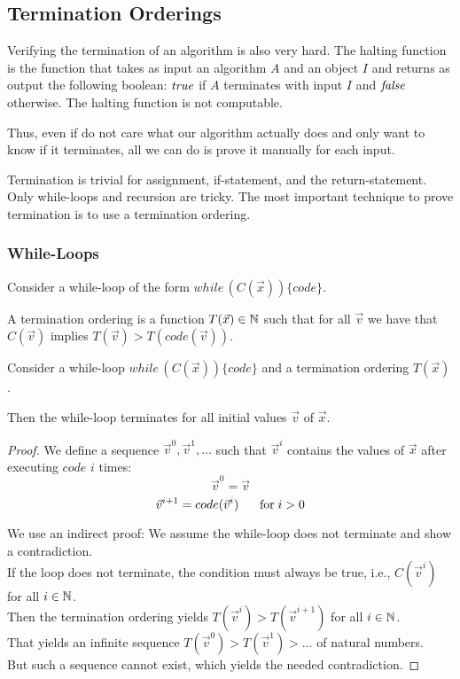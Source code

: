 \subsection{Termination Orderings}\label{sec:ad:termord}

Verifying the termination of an algorithm is also very hard.
The halting function is the function that takes as input an algorithm $A$ and an object $I$ and returns as output the following boolean: $\mathit{true}$ if $A$ terminates with input $I$ and $\mathit{false}$ otherwise.
The halting function is not computable.

Thus, even if do not care what our algorithm actually does and only want to know if it terminates, all we can do is prove it manually for each input.

Termination is trivial for assignment, if-statement, and the return-statement.
Only while-loops and recursion are tricky.
The most important technique to prove termination is to use a termination ordering.

\subsubsection{While-Loops}

\begin{definition}\label{sec:def:termord}
Consider a while-loop of the form $while\,(C(\vec{x}))\{code\}$.

A termination ordering is a function $T(\vec{x})\in\mathbb{N}$ such that for all $\vec{v}$ we have that $C(\vec{v})$ implies $T(\vec{v})>T(code(\vec{v}))$.
\end{definition}

\begin{theorem}\label{sec:thm:termord}
Consider a while-loop $while\,(C(\vec{x}))\{code\}$ and a termination ordering $T(\vec{x})$.

Then the while-loop terminates for all initial values $\vec{v}$ of $\vec{x}$.
\end{theorem}
\begin{proof}
We define a sequence $\vec{v}^0, \vec{v}^1, \ldots$ such that $\vec{v}^i$ contains the values of $\vec{x}$ after executing $code$ $i$ times:
\[\vec{v}^0=\vec{v}\]
\[\vec{v}^{i+1}=code(\vec{v}^i) \hspace*{.5cm} \;\mathrm{for}\; i>0\]
\medskip

We use an indirect proof: We assume the while-loop does not terminate and show a contradiction.\\
If the loop does not terminate, the condition must always be true, i.e., $C(\vec{v}^i)$ for all $i\in\mathbb{N}$.\\
Then the termination ordering yields $T(\vec{v}^i)>T(\vec{v}^{i+1})$ for all $i\in\mathbb{N}$.\\
That yields an infinite sequence $T(\vec{v}^0) > T(\vec{v}^1) > \ldots $ of natural numbers.\\
But such a sequence cannot exist, which yields the needed contradiction.
\end{proof}


